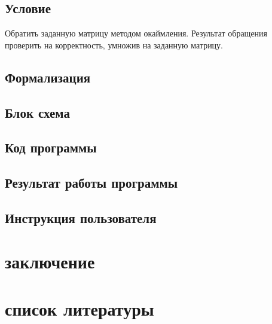 \documentclass[simple,14pt]{eskdtext}
\begin{document}
	\subsection{Условие}
	Обратить заданную матрицу методом окаймления. Результат обращения проверить на корректность, умножив на заданную матрицу. 
	\subsection{Формализация}
	
	\subsection{Блок схема}
	\subsection{Код программы}
	\subsection{Результат работы программы}
	\subsection{Инструкция пользователя}
	
	\section*{заключение}
	\section*{список  литературы}
\end{document}

